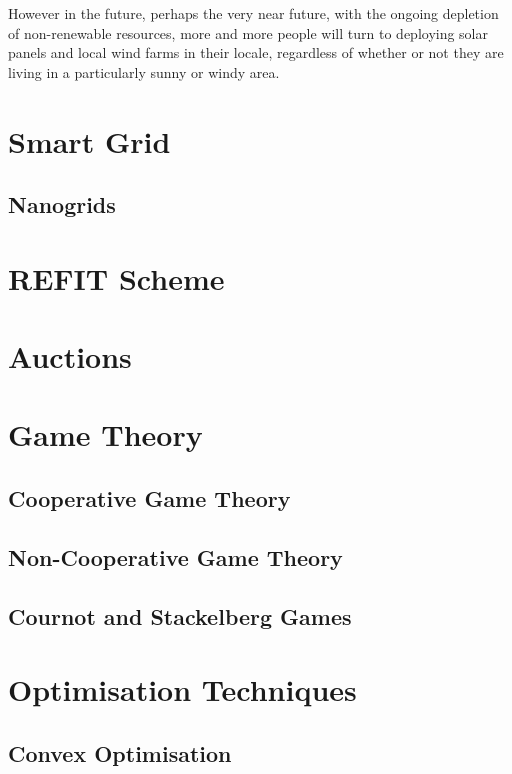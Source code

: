 \documentclass[a4paper, notitlepage]{report}
\begin{document}
However in the future, perhaps the very near future, with the ongoing depletion
of non-renewable resources, more and more people will turn to deploying solar
panels and local wind farms in their locale, regardless of whether or not they
are living in a particularly sunny or windy area.     
\chapter{Smart Grid}
\label{sec:org1094421}

\section{Nanogrids}
\label{sec:org9e07ad8}

\chapter{REFIT Scheme}
\label{sec:org1c01036}
\chapter{Auctions}
\label{sec:org27cdc33}


\chapter{Game Theory}
\label{sec:org45a398e}
\section{Cooperative Game Theory}
\label{sec:org80a932f}

\section{Non-Cooperative Game Theory}
\label{sec:org88a2d30}

\section{Cournot and Stackelberg Games}
\label{sec:org75e5f69}

\chapter{Optimisation Techniques}
\label{sec:orgb090d24}

\section{Convex Optimisation}
\label{sec:org6eb6923}
\end{document}
